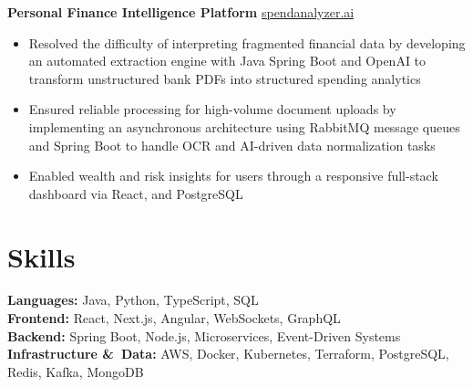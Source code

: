 \documentclass[11pt]{article}       %
\begin{document}
\textbf{Personal Finance Intelligence Platform} \hfill \href{https://spend-analyzer-coral.vercel.app/login/demo}{spendanalyzer.ai} \\
\vspace{-9pt}
\begin{itemize}
  \item Resolved the difficulty of interpreting fragmented financial data by developing an automated extraction engine with Java Spring Boot and OpenAI to transform unstructured bank PDFs into structured spending analytics
  \item Ensured reliable processing for high-volume document uploads by implementing an asynchronous architecture using RabbitMQ message queues and Spring Boot to handle OCR and AI-driven data normalization tasks
  \item Enabled wealth and risk insights for users through a responsive full-stack dashboard via React, and PostgreSQL
\end{itemize}


\vspace{-18.5pt}

\section*{Skills}
\textbf{Languages:} Java, Python, TypeScript, SQL \\
\textbf{Frontend:} React, Next.js, Angular, WebSockets, GraphQL \\
\textbf{Backend:} Spring Boot, Node.js, Microservices, Event-Driven Systems \\
\textbf{Infrastructure \&\ Data:} AWS, Docker, Kubernetes, Terraform, PostgreSQL, Redis, Kafka, MongoDB
\end{document}
